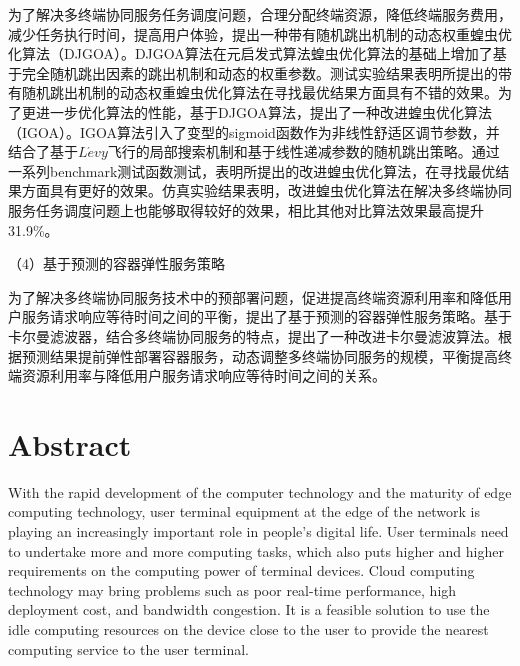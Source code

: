 为了解决多终端协同服务任务调度问题，合理分配终端资源，降低终端服务费用，减少任务执行时间，提高用户体验，提出一种带有随机跳出机制的动态权重蝗虫优化算法（DJGOA）。DJGOA算法在元启发式算法蝗虫优化算法的基础上增加了基于完全随机跳出因素的跳出机制和动态的权重参数。测试实验结果表明所提出的带有随机跳出机制的动态权重蝗虫优化算法在寻找最优结果方面具有不错的效果。为了更进一步优化算法的性能，基于DJGOA算法，提出了一种改进蝗虫优化算法（IGOA）。IGOA算法引入了变型的sigmoid函数作为非线性舒适区调节参数，并结合了基于$L\acute{e}vy$飞行的局部搜索机制和基于线性递减参数的随机跳出策略。通过一系列benchmark测试函数测试，表明所提出的改进蝗虫优化算法，在寻找最优结果方面具有更好的效果。仿真实验结果表明，改进蝗虫优化算法在解决多终端协同服务任务调度问题上也能够取得较好的效果，相比其他对比算法效果最高提升31.9\%。

（4）基于预测的容器弹性服务策略

为了解决多终端协同服务技术中的预部署问题，促进提高终端资源利用率和降低用户服务请求响应等待时间之间的平衡，提出了基于预测的容器弹性服务策略。基于卡尔曼滤波器，结合多终端协同服务的特点，提出了一种改进卡尔曼滤波算法。根据预测结果提前弹性部署容器服务，动态调整多终端协同服务的规模，平衡提高终端资源利用率与降低用户服务请求响应等待时间之间的关系。

\chapter*{Abstract}%

With the rapid development of the computer technology and the maturity of edge computing technology, user terminal equipment at the edge of the network is playing an increasingly important role in people's digital life. User terminals need to undertake more and more computing tasks, which also puts higher and higher requirements on the computing power of terminal devices. Cloud computing technology may bring problems such as poor real-time performance, high deployment cost, and bandwidth congestion. It is a feasible solution to use the idle computing resources on the device close to the user to provide the nearest computing service to the user terminal.

